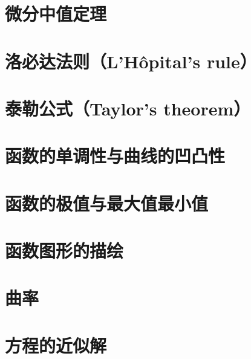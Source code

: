 \documentclass{article}
\begin{document}
  \tableofcontents
  \newpage

  \section{微分中值定理}
    
  \section{洛必达法则（L'Hôpital's rule）}
    
  \section{泰勒公式（Taylor's theorem）}
    
  \section{函数的单调性与曲线的凹凸性}
    
  \section{函数的极值与最大值最小值}
    
  \section{函数图形的描绘}
    
  \section{曲率}
    
  \section{方程的近似解}
    
\end{document}
